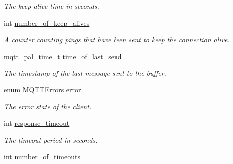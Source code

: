 \begin{DoxyCompactItemize}
\begin{DoxyCompactList}\small\item\em The keep-\/alive time in seconds. \end{DoxyCompactList}\item 
int \hyperlink{structmqtt__client_ac23a02868e9b8c5cd2619b73ee4fcea6}{number\+\_\+of\+\_\+keep\+\_\+alives}
\begin{DoxyCompactList}\small\item\em A counter counting pings that have been sent to keep the connection alive. \end{DoxyCompactList}\item 
mqtt\+\_\+pal\+\_\+time\+\_\+t \hyperlink{structmqtt__client_a9e1ad5b2573d6e693a21031a89b1717e}{time\+\_\+of\+\_\+last\+\_\+send}
\begin{DoxyCompactList}\small\item\em The timestamp of the last message sent to the buffer. \end{DoxyCompactList}\item 
enum \hyperlink{group__api_gad0c901a8d30691ed0ca17915b691b7e7}{M\+Q\+T\+T\+Errors} \hyperlink{structmqtt__client_a99e1742736d93361e44c4412e730f113}{error}
\begin{DoxyCompactList}\small\item\em The error state of the client. \end{DoxyCompactList}\item 
int \hyperlink{structmqtt__client_a4ee652148f2b1b338f1527a85879e970}{response\+\_\+timeout}
\begin{DoxyCompactList}\small\item\em The timeout period in seconds. \end{DoxyCompactList}\item 
int \hyperlink{structmqtt__client_af5fed75fb3f83137d5c7635693cd7b6c}{number\+\_\+of\+\_\+timeouts}\hypertarget{structmqtt__client_af5fed75fb3f83137d5c7635693cd7b6c}{}\label{structmqtt__client_af5fed75fb3f83137d5c7635693cd7b6c}


\end{DoxyCompactItemize}
